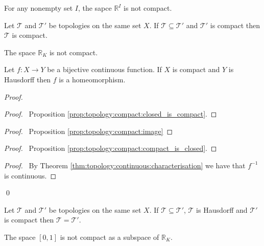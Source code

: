 \begin{cor}
  For any nonempty set $I$,
  the sapce $\mathbb{R}^I$ is not compact.
\end{cor}

\begin{cor}
  Let $\mathcal{T}$ and $\mathcal{T}'$ be topologies on the same
set $X$. If $\mathcal{T} \subseteq \mathcal{T}'$ and
$\mathcal{T}'$ is compact then $\mathcal{T}$ is compact.
\end{cor}

      \begin{cor}
        The space $\mathbb{R}_K$ is not compact.
      \end{cor}

\begin{thm}
  \label{thm:topology:compact:homeomorphism}
  Let $f : X \rightarrow Y$ be a bijective continuous function. If $X$ is
  compact and $Y$ is Hausdorff then $f$ is a homeomorphism.
\end{thm}

\begin{proof}
  \pf
  \begin{proof}
    \pf\ Proposition \ref{prop:topology:compact:closed_is_compact}.
  \end{proof}
  \begin{proof}
    \pf\ Proposition \ref{prop:topology:compact:image}
  \end{proof}
  \begin{proof}
    \pf\ Proposition \ref{prop:topology:compact:compact_is_closed}.
  \end{proof}
  \qedstep
  \begin{proof}
    \pf\ By Theorem
    \ref{thm:topology:continuous:characterisation}
    we have that      $f^{-1}$ is continuous.
  \end{proof}
  \qed
\end{proof}

\begin{cor}
  \label{cor:topology:compact_hausdorff:finer_coarser}
 Let $\mathcal{T}$ and $\mathcal{T}'$ be topologies on the same set $X$. If $\mathcal{T} \subseteq \mathcal{T}'$, $\mathcal{T}$ is Hausdorff and $\mathcal{T}'$ is compact then $\mathcal{T} = \mathcal{T}'$.
\end{cor}

\begin{cor}
  \label{cor:topology:compact_hausdorff:01K}
  The space $[0,1]$ is not compact as a subspace of $\mathbb{R}_K$.
\end{cor}

